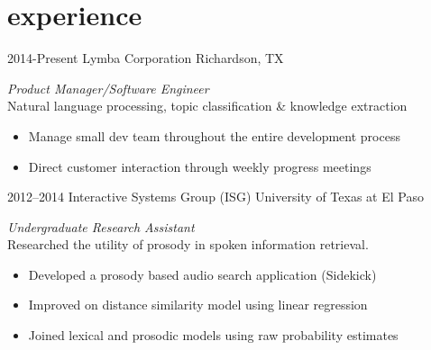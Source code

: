 \documentclass[]{friggeri-cv} %
\begin{document}

\section{experience }

\begin{entrylist}
\entry
{2014-Present}
{Lymba Corporation}
{Richardson, TX}
{\emph{Product Manager/Software Engineer} \\
Natural language processing, topic classification \& knowledge extraction
\begin{itemize}
\item Manage small dev team throughout the entire development process
\end{itemize}
\begin{itemize}
\item Direct customer interaction through weekly progress meetings
\end{itemize}}
\entry
{2012--2014}
{Interactive Systems Group  {\normalfont (ISG)}}
{University of Texas at El Paso}
{\emph{Undergraduate Research Assistant} \\
Researched the utility of prosody in spoken information retrieval.
\begin{itemize}
\item %
Developed a prosody based audio search application (Sidekick)
\end{itemize}
\begin{itemize}
\item Improved on distance similarity model using linear regression
\end{itemize}
\begin{itemize}
\item Joined lexical and prosodic models using raw probability estimates
\end{itemize}}
\end{entrylist}

\end{document}
